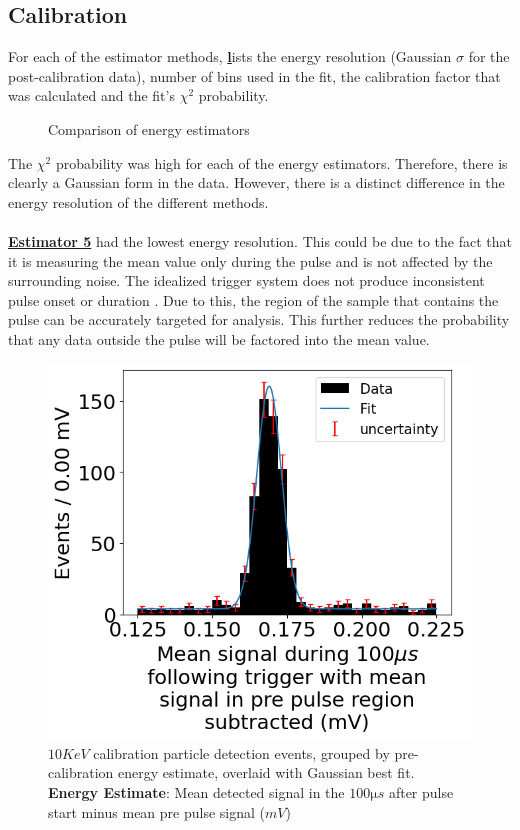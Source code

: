 \documentclass[
	letterpaper, %
	10pt, %
]{template}
\newcommand{\bref}[2]{\textbf{\hyperref[#1]{#2}}}
\begin{document}
\subsection{Calibration}
For each of the estimator methods, \bref{fig::4} lists the energy resolution (Gaussian $\sigma$ for the post-calibration data), number of bins used in the fit, the calibration factor that was calculated and the fit's $\chi^2$ probability.
\begin{figure}[H]\label{fig::4}
\centering

\caption{Comparison of energy estimators}
\end{figure}
The $\chi^2$ probability was high for each of the energy estimators. Therefore, there is clearly a Gaussian form in the data. However, there is a distinct difference in the energy resolution of the different methods.\\\\
\bref{est-5}{Estimator 5} had the lowest energy resolution. This could be due to the fact that it is measuring the mean value only during the pulse and is not affected by the surrounding noise. The idealized trigger system does not produce inconsistent pulse onset or duration \cite{labManual}. Due to this, the region of the sample that contains the pulse can be accurately targeted for analysis. This further reduces the probability that any data outside the pulse will be factored into the mean value.
\begin{figure}[H]
	\centering
	\begin{minipage}[t]{0.45\linewidth}
	\includegraphics[width=\textwidth]{figures/area3.png}
	\caption{
		$10\unit{KeV}$ calibration particle detection events, grouped by pre-calibration energy estimate, overlaid with Gaussian best fit.\\
		\textbf{Energy Estimate}: Mean detected signal in the $100\unit{\micro s}$ after pulse start minus mean pre pulse signal  ($\unit{mV}$)
	}
	\end{minipage}
\end{figure}
\end{document}
